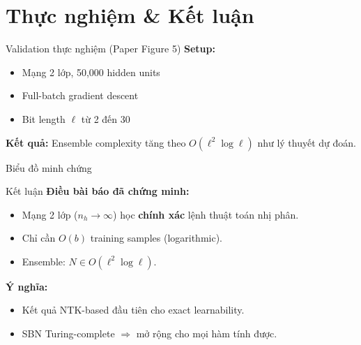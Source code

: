 \section{Thực nghiệm \& Kết luận}

\begin{frame}{Validation thực nghiệm (Paper Figure 5)}
  \textbf{Setup:}
  \begin{itemize}
    \item Mạng 2 lớp, 50,000 hidden units
    \item Full-batch gradient descent
    \item Bit length $\ell$ từ 2 đến 30
  \end{itemize}

  \vspace{0.3cm}
  \textbf{Kết quả:} Ensemble complexity tăng theo $O(\ell^2 \log \ell)$ như lý thuyết dự đoán.
\end{frame}

\begin{frame}{Biểu đồ minh chứng}
\centering
{}
\end{frame}

\begin{frame}{Kết luận}
  \textbf{Điều bài báo đã chứng minh:}
  \begin{itemize}
    \item Mạng 2 lớp ($n_h \to \infty$) học \textbf{chính xác} lệnh thuật toán nhị phân.
    \item Chỉ cần $O(b)$ training samples (logarithmic).
    \item Ensemble: $N \in O(\ell^2 \log \ell)$.
  \end{itemize}

  \vspace{0.3cm}
  \textbf{Ý nghĩa:}
  \begin{itemize}
    \item Kết quả NTK-based đầu tiên cho exact learnability.
    \item SBN Turing-complete $\Rightarrow$ mở rộng cho mọi hàm tính được.
  \end{itemize}
\end{frame}


